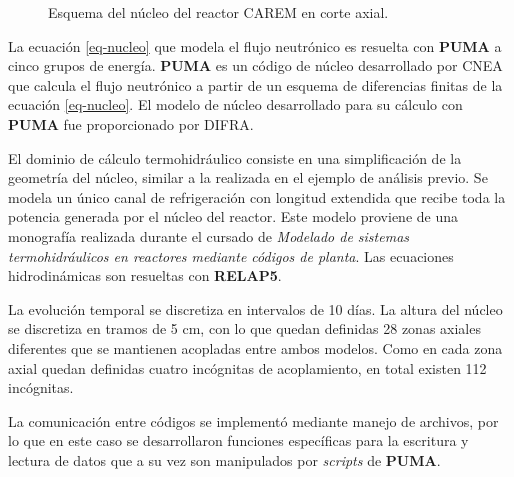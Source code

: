\begin{figure}

\caption[Esquema del núcleo del reactor CAREM en corte axial]
{Esquema del núcleo del reactor CAREM en corte axial.}
\label{carem}
\end{figure}
La ecuación \ref{eq-nucleo} que modela el flujo neutrónico es resuelta con \textbf{PUMA} \cite{puma} a cinco grupos de energía.
\textbf{PUMA} es un código de núcleo desarrollado por CNEA que calcula el flujo neutrónico a partir de un esquema de diferencias finitas de la ecuación \ref{eq-nucleo}.
El modelo de núcleo desarrollado para su cálculo con \textbf{PUMA} fue proporcionado por DIFRA.

El dominio de cálculo termohidráulico consiste en una simplificación de la geometría del núcleo, similar a la realizada en el ejemplo de análisis previo.
Se modela un único canal de refrigeración con longitud extendida que recibe toda la potencia generada por el núcleo del reactor.
Este modelo proviene de una monografía \cite{relap-carem} realizada durante el cursado de \textit{Modelado de sistemas termohidráulicos en reactores mediante códigos de planta}.
Las ecuaciones hidrodinámicas son resueltas con \textbf{RELAP5}.

La evolución temporal se discretiza en intervalos de 10 días.
La altura del núcleo se discretiza en tramos de 5 cm, con lo que quedan definidas 28 zonas axiales diferentes que se mantienen acopladas entre ambos modelos.
Como en cada zona axial quedan definidas cuatro incógnitas de acoplamiento, en total existen 112 incógnitas.

La comunicación entre códigos se implementó mediante manejo de archivos,
por lo que en este caso se desarrollaron funciones específicas para la escritura y lectura de datos que a su vez son manipulados por \textit{scripts} de \textbf{PUMA}.

